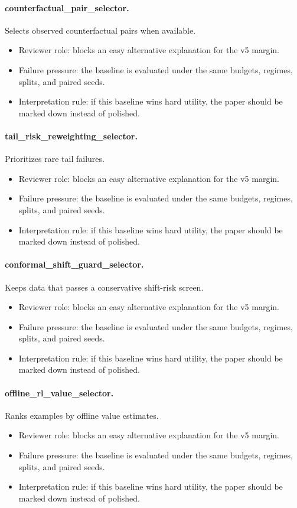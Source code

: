 \documentclass{article}
\begin{document}
\paragraph{counterfactual\_pair\_selector.} Selects observed counterfactual pairs when available.
\begin{itemize}
\item Reviewer role: blocks an easy alternative explanation for the v5 margin.
\item Failure pressure: the baseline is evaluated under the same budgets, regimes, splits, and paired seeds.
\item Interpretation rule: if this baseline wins hard utility, the paper should be marked down instead of polished.
\end{itemize}
\paragraph{tail\_risk\_reweighting\_selector.} Prioritizes rare tail failures.
\begin{itemize}
\item Reviewer role: blocks an easy alternative explanation for the v5 margin.
\item Failure pressure: the baseline is evaluated under the same budgets, regimes, splits, and paired seeds.
\item Interpretation rule: if this baseline wins hard utility, the paper should be marked down instead of polished.
\end{itemize}
\paragraph{conformal\_shift\_guard\_selector.} Keeps data that passes a conservative shift-risk screen.
\begin{itemize}
\item Reviewer role: blocks an easy alternative explanation for the v5 margin.
\item Failure pressure: the baseline is evaluated under the same budgets, regimes, splits, and paired seeds.
\item Interpretation rule: if this baseline wins hard utility, the paper should be marked down instead of polished.
\end{itemize}
\paragraph{offline\_rl\_value\_selector.} Ranks examples by offline value estimates.
\begin{itemize}
\item Reviewer role: blocks an easy alternative explanation for the v5 margin.
\item Failure pressure: the baseline is evaluated under the same budgets, regimes, splits, and paired seeds.
\item Interpretation rule: if this baseline wins hard utility, the paper should be marked down instead of polished.
\end{itemize}
\end{document}

